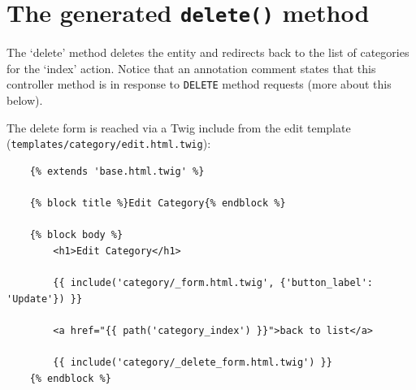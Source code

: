 \documentclass[a4paperpaper,openright]{book}
\newenvironment{Shaded}{}{}
\newcommand{\AnnotationTok}[1]{\textcolor[rgb]{0.38,0.63,0.69}{\textbf{\textit{#1}}}}
\newcommand{\CommentTok}[1]{\textcolor[rgb]{0.38,0.63,0.69}{\textit{#1}}}
\newcommand{\FunctionTok}[1]{\textcolor[rgb]{0.02,0.16,0.49}{#1}}
\newcommand{\KeywordTok}[1]{\textcolor[rgb]{0.00,0.44,0.13}{\textbf{#1}}}
\newcommand{\NormalTok}[1]{#1}
\newcommand{\OtherTok}[1]{\textcolor[rgb]{0.00,0.44,0.13}{#1}}
\newcommand{\StringTok}[1]{\textcolor[rgb]{0.25,0.44,0.63}{#1}}
\begin{document}
\hypertarget{the-generated-delete-method}{%
\section{\texorpdfstring{The generated \texttt{delete()}
method}{The generated delete() method}}\label{the-generated-delete-method}}

The `delete' method deletes the entity and redirects back to the list of
categories for the `index' action. Notice that an annotation comment
states that this controller method is in response to \texttt{DELETE}
method requests (more about this below).

\begin{Shaded}
\end{Shaded}

The delete form is reached via a Twig include from the edit template
(\texttt{templates/category/edit.html.twig}):

\begin{verbatim}
    {% extends 'base.html.twig' %}
    
    {% block title %}Edit Category{% endblock %}
    
    {% block body %}
        <h1>Edit Category</h1>
    
        {{ include('category/_form.html.twig', {'button_label': 'Update'}) }}
    
        <a href="{{ path('category_index') }}">back to list</a>
    
        {{ include('category/_delete_form.html.twig') }}
    {% endblock %}
\end{verbatim}
\end{document}
